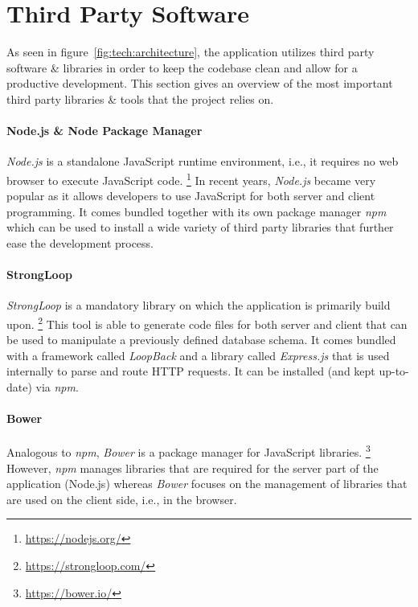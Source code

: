 \documentclass[nochapterpage,nopartpage,noheadingspace,numbersubsubsec,bigchapter,colorback,accentcolor=tud9c,10pt]{tudreport}
\begin{document}
  \section{Third Party Software}
  \label{sec:tech:architecture:3rd-party}

    As seen in figure~\ref{fig:tech:architecture}, the application utilizes third party software \& libraries in order to keep the codebase clean and allow for a productive development. This section gives an overview of the most important third party libraries \& tools that the project relies on.

  \paragraph{Node.js \& Node Package Manager}
    \emph{Node.js} is a standalone JavaScript runtime environment, i.e., it requires no web browser to execute JavaScript code.%
    \footnote{\url{https://nodejs.org/}}
    In recent years, \emph{Node.js} became very popular as it allows developers to use JavaScript for both server and client programming. It comes bundled together with its own package manager \emph{npm} which can be used to install a wide variety of third party libraries that further ease the development process.

  \paragraph{StrongLoop}
    \emph{StrongLoop} is a mandatory library on which the application is primarily build upon.%
    \footnote{\url{https://strongloop.com/}}
    This tool is able to generate code files for both server and client that can be used to manipulate a previously defined database schema. It comes bundled with a framework called \emph{LoopBack} and a library called \emph{Express.js} that is used internally to parse and route HTTP requests. It can be installed (and kept up-to-date) via \emph{npm}.

  \paragraph{Bower}
    Analogous to \emph{npm}, \emph{Bower} is a package manager for JavaScript libraries.%
    \footnote{\url{https://bower.io/}}
    However, \emph{npm} manages libraries that are required for the server part of the application (Node.js) whereas \emph{Bower} focuses on the management of libraries that are used on the client side, i.e., in the browser.
\end{document}
